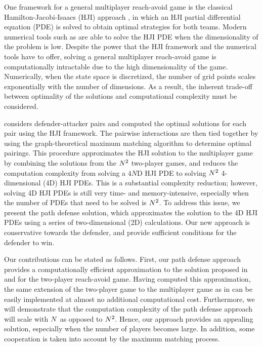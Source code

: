 One framework for a general multiplayer reach-avoid game is the classical Hamilton-Jacobi-Isaacs (HJI) approach \cite{b:isaacs-1967}, in which an HJI partial differential equation (PDE) is solved to obtain optimal strategies for both teams. Modern numerical tools such as \cite{j:mitchell-TAC-2005, Sethian1996, b:osher-fedkiw-2002} are able to solve the HJI PDE when the dimensionality of the problem is low. Despite the power that the HJI framework and the numerical tools have to offer, solving a general multiplayer reach-avoid game is computationally intractable due to the high dimensionality of the game. Numerically, when the state space is discretized, the number of grid points scales exponentially with the number of dimensions. As a result, the inherent trade-off between optimality of the solutions and computational complexity must be considered. 

\cite{Chen2014} considers defender-attacker pairs and computed the optimal solutions for each pair using the HJI framework. The pairwise interactions are then tied together by using the graph-theoretical maximum matching algorithm \cite{Schrjiver2004, Karpinski1998} to determine optimal pairings. This procedure approximates the HJI solution to the multiplayer game by combining the solutions from the $N^2$ two-player games, and reduces the computation complexity from solving a $4N$D HJI PDE to solving $N^2$ 4-dimensional (4D) HJI PDEs. This is a substantial complexity reduction; however, solving 4D HJI PDEs is still very time- and memory-intensive, especially when the number of PDEs that need to be solved is $N^2$. To address this issue, we present the path defense solution, which approximates the solution to the 4D HJI PDEs using a series of two-dimensional (2D) calculations. Our new approach is conservative towards the defender, and provide sufficient conditions for the defender to win.

Our contributions can be stated as follows. First, our path defense approach provides a computationally efficient approximation to the solution proposed in \cite{Huang2011} and \cite{Chen2014} for the two-player reach-avoid game. Having computed this approximation, the same extension of the two-player game to the multiplayer game as in \cite{Chen2014} can be easily implemented at almost no additional computational cost. Furthermore, we will demonstrate that the computation complexity of the path defense approach will scale with $N$ as opposed to $N^2$. Hence, our approach provides an appealing solution, especially when the number of players becomes large. In addition, some cooperation is taken into account by the maximum matching process. 

